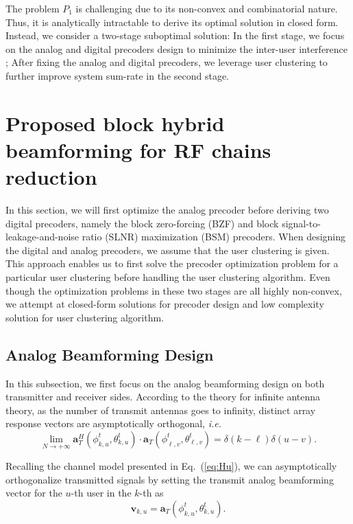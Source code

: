\documentclass[conference]{IEEEtran}
\begin{document}
{The problem $P_1$ is challenging due to its non-convex and combinatorial nature. Thus, it is analytically intractable to derive its optimal solution in closed form. Instead, we consider a two-stage suboptimal solution: In the first stage, we focus on the analog  and digital precoders design to minimize the inter-user interference ; After fixing the analog and digital precoders, we leverage user clustering to further improve system sum-rate in the second stage.

\section{Proposed block hybrid beamforming for RF chains reduction}
In this section, we will first optimize the analog precoder before deriving two digital precoders, namely the block zero-forcing (BZF) and block signal-to-leakage-and-noise ratio (SLNR) maximization (BSM) precoders. When designing the digital and analog precoders, we assume that the user clustering is given. This approach enables us to first solve the precoder optimization problem for a particular user clustering before handling the user clustering algorithm. Even though the optimization problems in these two stages are all highly non-convex, we attempt at closed-form solutions for precoder design and low complexity solution for user clustering algorithm.

\subsection{Analog Beamforming Design}\label{analog}
In this subsection, we first focus on the analog beamforming design on both transmitter and receiver sides. According to the theory for infinite antenna theory, as the number of transmit antennas goes to infinity, distinct array response vectors are asymptotically orthogonal, {\em i.e.}
\begin{equation}\label{Eq:assumption}
\lim_{N\rightarrow +\infty} \bm{a}_{T}^{H}(\phi^t_{k,u},\theta^t_{k,u}) \cdot\bm{a}_{T}(\phi^t_{\ell,v},\theta^t_{\ell,v})=\delta(k-\ell)\delta(u-v).
\end{equation}

Recalling the channel model presented in Eq.~(\ref{eq:Hu}), we can asymptotically orthogonalize transmitted signals by setting the transmit analog beamforming vector for the $u$-th user in the $k$-th as
\begin{equation}
\bm{v}_{k,u}=\bm{a}_{T}(\phi^t_{k,u},\theta^t_{k,u}).
\label{eq:vku}
\end{equation}

}
\end{document}
